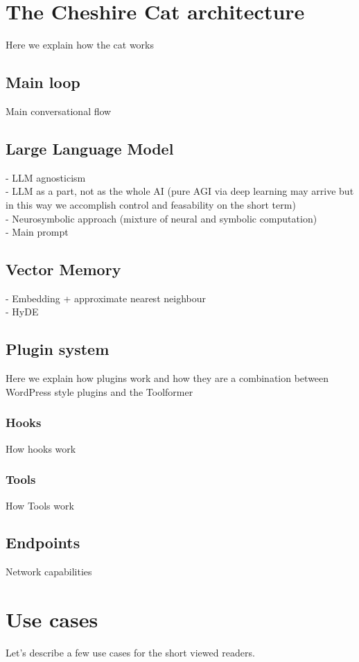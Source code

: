 \documentclass{article}
\begin{document}
\section{The Cheshire Cat architecture}

Here we explain how the cat works

\subsection{Main loop}
Main conversational flow

\subsection{Large Language Model}
- LLM agnosticism\\
- LLM as a part, not as the whole AI (pure AGI via deep learning may arrive but in this way we accomplish control and feasability on the short term)\\
- Neurosymbolic approach (mixture of neural and symbolic computation)\\
- Main prompt

\subsection{Vector Memory}
- Embedding + approximate nearest neighbour\\
- HyDE

\subsection{Plugin system}
Here we explain how plugins work and how they are a combination between WordPress style plugins and the Toolformer

\subsubsection{Hooks}
How hooks work

\subsubsection{Tools}
How Tools work

\subsection{Endpoints}
Network capabilities

\section{Use cases}
Let's describe a few use cases for the short viewed readers.
\end{document}
